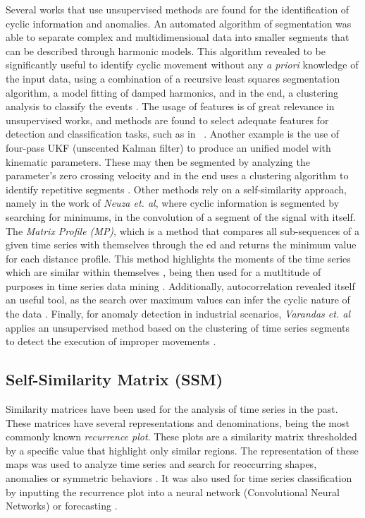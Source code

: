 Several works that use unsupervised methods are found for the identification of cyclic information and anomalies. An automated algorithm of segmentation was able to separate complex and multidimensional data into smaller segments that can be described through harmonic models. This algorithm revealed to be significantly useful to identify cyclic movement without any \textit{a priori} knowledge of the input data, using a combination of a recursive least squares segmentation algorithm, a model fitting of damped harmonics, and in the end, a clustering analysis to classify the events \cite{Lu2004,Lu2003}. The usage of features is of great relevance in unsupervised works, and methods are found to select adequate features for detection and classification tasks, such as in ~\cite{machado2015}. Another example is the use of four-pass UKF (unscented Kalman filter) to produce an unified model with kinematic parameters. These may then be segmented by analyzing the parameter's zero crossing velocity and in the end uses a clustering algorithm to identify repetitive segments \cite{Wang2015a}. Other methods rely on a self-similarity approach, namely in the work of \textit{Neuza et. al}\cite{neuza}, where cyclic information is segmented by searching for minimums, in the convolution of a segment of the signal with itself. The \textit{Matrix Profile (MP)}, which is a method that compares all sub-sequences of a given time series with themselves through the \gls{ed} and returns the minimum value for each distance profile. This method highlights the moments of the time series which are similar within themselves \cite{Yeh2018}, being then used for a mutltitude of purposes in time series data mining \cite{mpdist, mpxxiv, mpxix, mpxvi}. Additionally, autocorrelation revealed itself an useful tool, as the search over maximum values can infer the cyclic nature of the data \cite{Bauters2014}. Finally, for anomaly detection in industrial scenarios, \textit{Varandas et. al} applies an unsupervised method based on the clustering of time series segments to detect the execution of improper movements \cite{Varandas19}. 

\subsection{Self-Similarity Matrix (SSM)}

Similarity matrices have been used for the analysis of time series in the past. These matrices have several representations and denominations, being the most commonly known \textit{recurrence plot}. These plots are a similarity matrix thresholded by a specific value that highlight only similar regions. The representation of these maps was used to analyze time series \cite{eamonn_dotplots,recurrenceplots1} and search for reoccurring shapes, anomalies or symmetric behaviors \cite{eamonn_dotplots}. It was also used for time series classification by inputting the recurrence plot into a neural network (Convolutional Neural Networks) \cite{recurrenceplots1, recurrenceplots2} or forecasting \cite{recurrenceplots3}.

